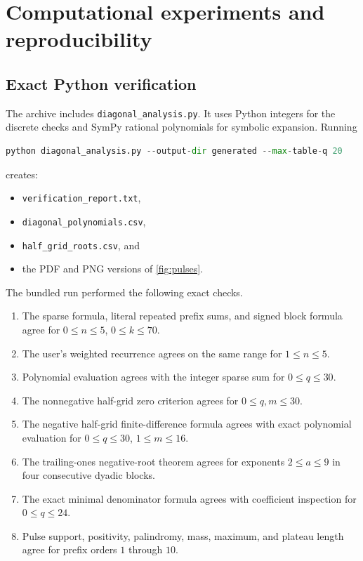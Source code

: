 \documentclass[11pt]{article}
\theoremstyle{definition}
\theoremstyle{remark}
\begin{document}
\section{Computational experiments and reproducibility}

\subsection{Exact Python verification}

The archive includes \texttt{diagonal\_analysis.py}.  It uses Python integers
for the discrete checks and SymPy rational polynomials for symbolic
expansion.  Running
\begin{lstlisting}[language=Python]
python diagonal_analysis.py --output-dir generated --max-table-q 20
\end{lstlisting}
creates:
\begin{itemize}[leftmargin=2em]
\item \texttt{verification\_report.txt},
\item \texttt{diagonal\_polynomials.csv},
\item \texttt{half\_grid\_roots.csv}, and
\item the PDF and PNG versions of \cref{fig:pulses}.
\end{itemize}

The bundled run performed the following exact checks.

\begin{enumerate}[leftmargin=2.2em]
\item The sparse formula, literal repeated prefix sums, and signed block
formula agree for \(0\leq n\leq5\), \(0\leq k\leq70\).
\item The user's weighted recurrence agrees on the same range for
\(1\leq n\leq5\).
\item Polynomial evaluation agrees with the integer sparse sum for
\(0\leq q\leq30\).
\item The nonnegative half-grid zero criterion agrees for
\(0\leq q,m\leq30\).
\item The negative half-grid finite-difference formula agrees with exact
polynomial evaluation for \(0\leq q\leq30\), \(1\leq m\leq16\).
\item The trailing-ones negative-root theorem agrees for exponents
\(2\leq a\leq9\) in four consecutive dyadic blocks.
\item The exact minimal denominator formula agrees with coefficient
inspection for \(0\leq q\leq24\).
\item Pulse support, positivity, palindromy, mass, maximum, and plateau length
agree for prefix orders \(1\) through \(10\).
\end{enumerate}
\end{document}
